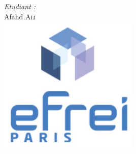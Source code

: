 \begin{titlepage}
    \Large \emph{Etudiant :}\\
    Afahd \textsc{Ali}\\[2cm] %
    
    
    
    
    \includegraphics[width=0.5\textwidth]{logo-efrei-paris.jpg}\\[2.5cm] %
    
    
    
    \vfill %
    
\end{titlepage}